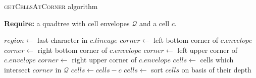 \begin{algorithm} \caption{\textsc{getCellsAtCorner} algorithm}
    \textbf{Require:} a quadtree with cell envelopes $\mathcal Q$ and a cell $c$.
    \begin{algorithmic}[1]
        \State $region \gets $ last character in $c.lineage$
                \State $corner \gets$ left bottom corner of $c.envelope$
            \EndCase
                \State $corner \gets$ right bottom corner of $c.envelope$
            \EndCase
                \State $corner \gets$ left upper corner of $c.envelope$
            \EndCase
                \State $corner \gets$ right upper corner of $c.envelope$
            \EndCase
        \EndSwitch
        \State $cells \gets$ cells which intersect $corner$ in $\mathcal Q$
        \State $cells \gets cells - c$ 
        \State $cells \gets$ sort $cells$ on basis of their depth 
        \State {}
    \EndFunction
    \end{algorithmic}
\end{algorithm}
